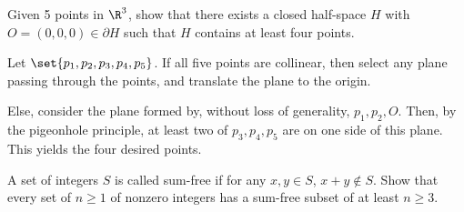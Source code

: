 \documentclass[10pt]{mypackage}
\begin{document}
\begin{problem}
Given 5 points in $\R^3$, show that there exists a closed half-space $H$ with $O = (0,0,0)\in \partial H$ such that $H$ contains at least four points.
\end{problem}
\begin{solution}
  Let $\set{p_1,p_2,p_3,p_4,p_5}$. If all five points are collinear, then select any plane passing through the points, and translate the plane to the origin.\newline

  Else, consider the plane formed by, without loss of generality, $p_1,p_2,O$. Then, by the pigeonhole principle, at least two of $p_3,p_4,p_5$ are on one side of this plane. This yields the four desired points.
\end{solution}
\begin{problem}
  A set of integers $S$ is called sum-free if for any $x,y\in S$, $x+y\notin S$. Show that every set of $n\geq 1$ of nonzero integers has a sum-free subset of at least $n\geq 3$.
\end{problem}
\end{document}
